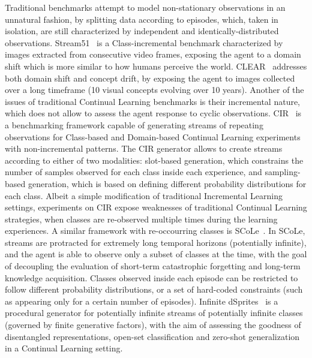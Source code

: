 Traditional benchmarks attempt to model non-stationary observations in an unnatural fashion, by splitting data according to episodes, which, taken in isolation, are still characterized by independent and identically-distributed observations. Stream51~\cite{roady2020stream} is a Class-incremental benchmark characterized by images extracted from consecutive video frames, exposing the agent to a domain shift which is more similar to how humans perceive the world.
CLEAR~\cite{lin2021clear} addresses both domain shift and concept drift, by exposing the agent to images collected over a long timeframe (10 visual concepts evolving over 10 years).
%
Another of the issues of traditional Continual Learning benchmarks is their incremental nature, which does not allow to assess the agent response to cyclic observations. CIR~\cite{hemati2023class} is a benchmarking framework capable of generating streams of repeating observations for Class-based and Domain-based Continual Learning experiments with non-incremental patterns. The CIR generator allows to create streams according to either of two modalities: slot-based generation, which constrains the number of samples observed for each class inside each experience, and sampling-based generation, which is based on defining different probability distributions for each class. Albeit a simple modification of traditional Incremental Learning settings, experiments on CIR expose weaknesses of traditional Continual Learning strategies, when classes are re-observed multiple times during the learning experiences.
%
A similar framework with re-occourring classes is SCoLe~\cite{lesort2023challenging}. In SCoLe, streams are protracted for extremely long temporal horizons (potentially infinite), and the agent is able to observe only a subset of classes at the time, with the goal of decoupling the evaluation of short-term catastrophic forgetting and long-term knowledge acquisition. Classes observed inside each episode can be restricted to follow different probability distributions, or a set of hard-coded constraints (such as appearing only for a certain number of episodes).
%
Infinite dSprites~\cite{dziadzio2024infinite} is a procedural generator for potentially infinite streams of potentially infinite classes (governed by finite generative factors), with the aim of assessing the goodness of disentangled representations, open-set classification and zero-shot generalization in a Continual Learning setting.

